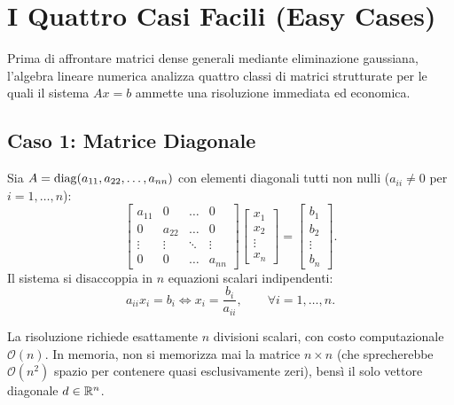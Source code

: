 \FloatBarrier
\section{I Quattro Casi Facili (Easy Cases)}
\label{sec:easy-cases}

Prima di affrontare matrici dense generali mediante eliminazione gaussiana, l'algebra lineare numerica analizza quattro classi di matrici strutturate per le quali il sistema $Ax = b$ ammette una risoluzione immediata ed economica.

\subsection{Caso 1: Matrice Diagonale}
Sia $A = \operatorname{diag}(a_{11}, a_{22}, \dots, a_{nn})$ con elementi diagonali tutti non nulli ($a_{ii} \neq 0$ per $i = 1, \dots, n$):
\begin{equation}
    \begin{bmatrix}
        a_{11} & 0 & \dots & 0 \\
        0 & a_{22} & \dots & 0 \\
        \vdots & \vdots & \ddots & \vdots \\
        0 & 0 & \dots & a_{nn}
    \end{bmatrix}
    \begin{bmatrix}
        x_1 \\ x_2 \\ \vdots \\ x_n
    \end{bmatrix}
    =
    \begin{bmatrix}
        b_1 \\ b_2 \\ \vdots \\ b_n
    \end{bmatrix}.
\end{equation}
Il sistema si disaccoppia in $n$ equazioni scalari indipendenti:
\begin{equation}
    a_{ii} x_i = b_i \iff x_i = \frac{b_i}{a_{ii}}, \qquad \forall i = 1, \dots, n.
    \label{eq:soluzione-diagonale}
\end{equation}
\begin{property}
La risoluzione richiede esattamente $n$ divisioni scalari, con costo computazionale $\mathcal{O}(n)$. In memoria, non si memorizza mai la matrice $n \times n$ (che sprecherebbe $\mathcal{O}(n^2)$ spazio per contenere quasi esclusivamente zeri), bens\`i il solo vettore diagonale $d \in \mathbb{R}^n$.
\end{property}

